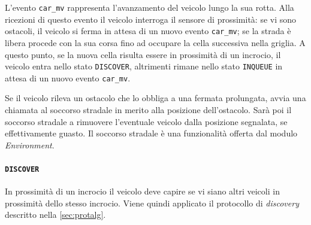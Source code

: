 \documentclass{memoir}
\begin{document}
\begin{figure}[h]
  \centering
\end{figure}

L'evento \texttt{car\_mv} rappresenta l'avanzamento del veicolo lungo la sua
rotta. Alla ricezioni di questo evento il veicolo interroga il sensore di
prossimità: se vi sono ostacoli, il veicolo si ferma in attesa di un nuovo
evento \texttt{car\_mv}; se la strada è libera procede con la sua corsa fino ad
occupare la cella successiva nella griglia. A questo punto, se la nuova cella
risulta essere in prossimità di un incrocio, il veicolo entra nello stato
\texttt{DISCOVER}, altrimenti rimane nello stato \texttt{INQUEUE} in attesa di
un nuovo evento \texttt{car\_mv}.

Se il veicolo rileva un ostacolo che lo obbliga a una fermata prolungata, avvia
una chiamata al soccorso stradale in merito alla posizione dell'ostacolo. Sarà
poi il soccorso stradale a rimuovere l'eventuale veicolo dalla posizione
segnalata, se effettivamente guasto. Il soccorso stradale è una funzionalità
offerta dal modulo \emph{Environment}.

\paragraph{\texttt{DISCOVER}}
In prossimità di un incrocio il veicolo deve capire se vi siano altri veicoli in
prossimità dello stesso incrocio. Viene quindi applicato il protocollo di
\emph{discovery} descritto nella \cref{sec:protalg}.
\end{document}
